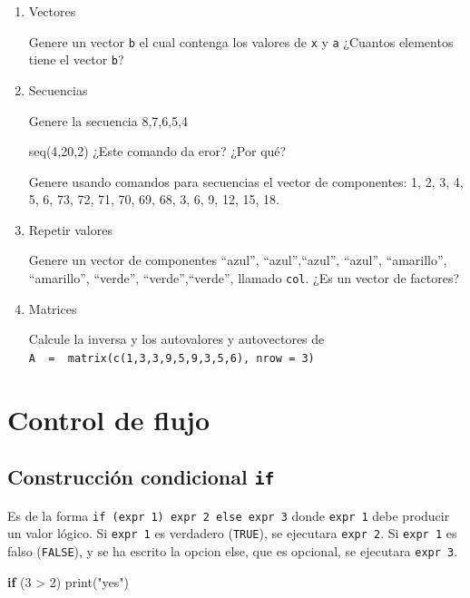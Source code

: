 \documentclass[
]{book}
\newenvironment{Shaded}{\begin{snugshade}}{\end{snugshade}}
\newcommand{\ControlFlowTok}[1]{\textcolor[rgb]{0.13,0.29,0.53}{\textbf{#1}}}
\newcommand{\DecValTok}[1]{\textcolor[rgb]{0.00,0.00,0.81}{#1}}
\newcommand{\FunctionTok}[1]{\textcolor[rgb]{0.00,0.00,0.00}{#1}}
\newcommand{\NormalTok}[1]{#1}
\newcommand{\SpecialCharTok}[1]{\textcolor[rgb]{0.00,0.00,0.00}{#1}}
\newcommand{\StringTok}[1]{\textcolor[rgb]{0.31,0.60,0.02}{#1}}
\begin{document}
\begin{enumerate}
\def\labelenumi{\arabic{enumi}.}
\item
  Vectores

  Genere un vector \texttt{b} el cual contenga los valores de \texttt{x} y \texttt{a} ¿Cuantos elementos tiene el vector \texttt{b}?
\item
  Secuencias

  Genere la secuencia 8,7,6,5,4

  seq(4,20,2) ¿Este comando da eror? ¿Por qué?

  Genere usando comandos para secuencias el vector de componentes: 1, 2, 3, 4, 5, 6, 73, 72, 71, 70, 69, 68, 3, 6, 9, 12, 15, 18.
\item
  Repetir valores

  Genere un vector de componentes ``azul'', ``azul'',``azul'', ``azul'', ``amarillo'', ``amarillo'', ``verde'', ``verde'',``verde'', llamado \texttt{col}. ¿Es un vector de factores?
\item
  Matrices

  Calcule la inversa y los autovalores y autovectores de \texttt{A\ \ =\ \ matrix(c(1,3,3,9,5,9,3,5,6),\ nrow\ =\ 3)}
\end{enumerate}

\hypertarget{control-de-flujo}{%
\chapter{Control de flujo}\label{control-de-flujo}}

\hypertarget{construcciuxf3n-condicional-if}{%
\section{\texorpdfstring{Construcción condicional \texttt{if}}{Construcción condicional if}}\label{construcciuxf3n-condicional-if}}

Es de la forma \texttt{if\ (expr\ 1)\ expr\ 2\ else\ expr\ 3} donde \texttt{expr\ 1} debe producir
un valor lógico. Si \texttt{expr\ 1} es verdadero (\texttt{TRUE}), se ejecutara \texttt{expr\ 2}.
Si \texttt{expr\ 1} es falso (\texttt{FALSE}), y se ha escrito la opcion else, que es
opcional, se ejecutara \texttt{expr\ 3}.

\begin{Shaded}
\begin{Highlighting}[]
\ControlFlowTok{if}\NormalTok{ (}\DecValTok{3} \SpecialCharTok{\textgreater{}} \DecValTok{2}\NormalTok{)}
  \FunctionTok{print}\NormalTok{(}\StringTok{"yes"}\NormalTok{)}
\end{Highlighting}
\end{Shaded}
\end{document}
